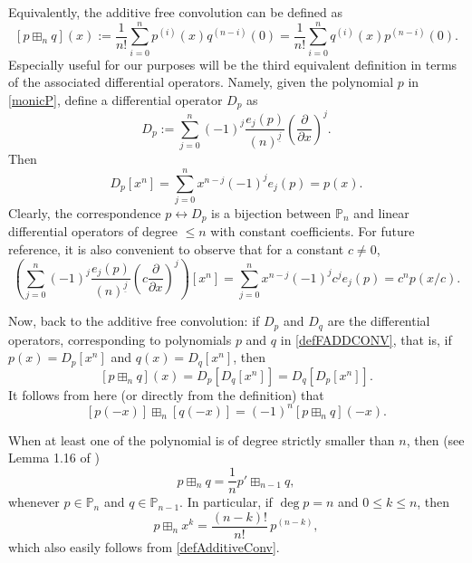 \documentclass[reqno,11pt]{amsart}
\theoremstyle{remark}
\renewcommand{\P}{\mathbb{P}}
\newcommand{\falling}[2]{\left(#1\right)^{\underline{#2}}}
\begin{document}
Equivalently, the additive free convolution can be defined as
\begin{equation}
    \label{defAdditiveConv}
    [p\boxplus_n q](x):=\frac{1}{n!} \sum_{i=0}^n p^{(i)}(x) q^{(n-i)}(0)=\frac{1}{n!} \sum_{i=0}^n q^{(i)}(x) p^{(n-i)}(0).
\end{equation}
Especially useful for our purposes will be the third equivalent definition in terms of the associated differential operators. Namely, given the polynomial $p$ in \eqref{monicP}, define
a differential operator $D_p$ as
\begin{equation}\label{diffOperatorforP}
    D_p:=\sum_{j=0}^n (-1)^j \frac{e_j(p)}{\falling{n}{j}} \left(\frac{\partial}{\partial x}\right)^j.
\end{equation}
Then 
\begin{equation}\label{correspondencediffOperatorforP}
    D_p[x^n]= \sum_{j=0}^n x^{n-j} (-1)^j e_j(p) =p(x).
\end{equation}
Clearly, the correspondence $p \leftrightarrow D_p$ is a bijection between $\mathbb P_n$ and linear differential operators of degree $\le n$ with constant coefficients. For future reference, it is also convenient to observe that for a constant $c\neq 0$,
\begin{equation}\label{correspondencediffOperatorforP2}
   \left( \sum_{j=0}^n (-1)^j \frac{e_j(p)}{\falling{n}{j}} \left(c \frac{\partial}{\partial x}\right)^j \right) [x^n]= \sum_{j=0}^n x^{n-j} (-1)^j c^j e_j(p) = c^n p(x/c).
\end{equation}
  
Now, back to the additive free convolution: if $D_p$ and $D_q$ are the differential operators, corresponding to polynomials $p$ and $q$ in \eqref{defFADDCONV}, that is, if $p(x)=D_p [x^n]$ and $q(x)=D_q [x^n]$, then
\begin{equation} \label{thirdDefAdditiveConv}
    [p\boxplus_n q](x)=D_p[D_q[x^n]]=D_q[D_p[x^n]].
\end{equation} 
It follows from here (or directly from the definition) that
\begin{equation} \label{inversion}
    [p(-x)]\boxplus_n [q(-x)]=(-1)^n[p\boxplus_n q](-x).
\end{equation} 
 
When at least one of the polynomial is of degree strictly smaller than $n$, then (see Lemma 1.16 of \cite{MR4408504})
\begin{equation}
    \label{derivativeFreeConv}
    p\boxplus_n q = \frac{1}{n} p'\boxplus_{n-1} q,
\end{equation}
whenever $p\in \P_n$ and $q\in \P_{n-1}$. In particular, if $\deg p=n$ and $0\le k \le n$, then
$$
p \boxplus_n x^k = \frac{(n-k)!}{n!} \, p^{(n-k)},
$$
which also easily follows from \eqref{defAdditiveConv}.
\end{document}
